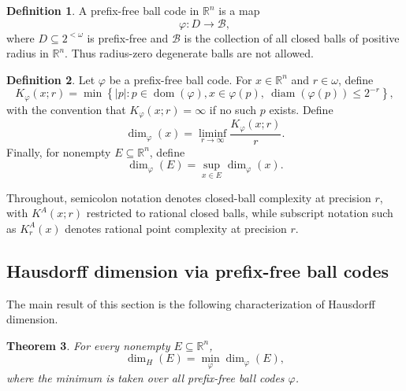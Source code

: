 \documentclass[a4paper,oneside,reqno,12pt]{amsart}
\theoremstyle{plain}
\newtheorem{theorem}{Theorem}[section]
\theoremstyle{definition}
\newtheorem{definition}[theorem]{Definition}
\theoremstyle{remark}
\DeclareMathOperator{\dom}{dom}
\DeclareMathOperator{\diam}{diam}
\begin{document}
\begin{definition}
\label{def:prefix-free-ball-code}
A prefix-free ball code in \(\mathbb R^n\) is a map
\[
\varphi:D\to\mathcal B,
\]
where \(D\subseteq2^{<\omega}\) is prefix-free and \(\mathcal B\) is the
collection of all closed balls of positive radius in \(\mathbb R^n\).  Thus
radius-zero degenerate balls are not allowed.
\end{definition}

\begin{definition}
\label{def:prefix-free-ball-code-dimension}
Let \(\varphi\) be a prefix-free ball code.
For \(x\in\mathbb R^n\) and \(r\in\omega\), define
\[
K_\varphi(x;r)
=
\min
\left\{
|p|
:
p\in\dom(\varphi),
x\in \varphi(p),
\ \diam(\varphi(p))\le 2^{-r}
\right\},
\]
with the convention that \(K_\varphi(x;r)=\infty\) if no such \(p\) exists.
Define
\[
\dim_\varphi(x)
=
\liminf_{r\to\infty}
\frac{K_\varphi(x;r)}{r}.
\]
Finally, for nonempty \(E\subseteq\mathbb R^n\), define
\[
\dim_\varphi(E)
=
\sup_{x\in E}\dim_\varphi(x).
\]
\end{definition}

Throughout,
semicolon notation denotes closed-ball complexity at precision \(r\), with
\(K^A(x;r)\) restricted to rational closed balls, while subscript notation such
as \(K^A_r(x)\) denotes rational point complexity at precision \(r\).


\subsection{Hausdorff dimension via prefix-free ball codes}

The main result of this section is the following characterization of Hausdorff
dimension.

\begin{theorem}
\label{thm:prefix-free-ball-code-hausdorff}
For every nonempty \(E\subseteq\mathbb R^n\),
\[
\dim_H(E)=\min_\varphi \dim_\varphi(E),
\]
where the minimum is taken over all prefix-free ball codes \(\varphi\).
\end{theorem}
\end{document}

